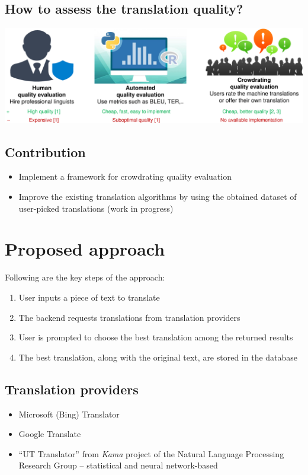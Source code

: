 \documentclass[a0,portrait]{a0poster}
\begin{document}
\begin{multicols}{2}
\subsection*{How to assess the translation quality?}
\begin{center}\vspace{1cm}
	\includegraphics[width=\linewidth]{figures/qualityEvaluation}
\end{center}

\subsection*{Contribution}
\begin{itemize}
	\item Implement a framework for crowdrating quality evaluation
	\item Improve the existing translation algorithms by using the obtained dataset of user-picked translations (work in progress)
\end{itemize}


\section*{Proposed approach}
Following are the key steps of the approach:
\begin{enumerate}
	\item User inputs a piece of text to translate
	\item The backend requests translations from translation providers
	\item User is prompted to choose the best translation among the returned results
	\item The best translation, along with the original text, are stored in the database
\end{enumerate}

\subsection*{Translation providers}
\begin{itemize}
	\item Microsoft (Bing) Translator
	\item Google Translate
	\item ``UT Translator'' from \emph{Kama} project of the Natural Language Processing Research Group -- statistical and neural network-based
\end{itemize}



\end{multicols}
\end{document}
